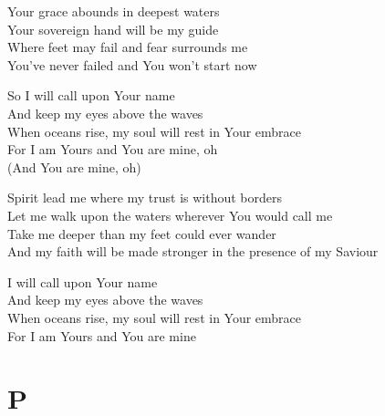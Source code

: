 \documentclass[aspectratio=169]{beamer}
\begin{document}
{\begin{frame}{}
Your grace abounds in deepest waters\\ 
Your sovereign hand will be my guide\\ 
Where feet may fail and fear surrounds me\\ 
You've never failed and You won't start now

\end{frame}
\hypertarget{Oceans[](Hillsong)C2}{}
\begin{frame}{}
\fontsize{14.0625}{16.875}\selectfont

So I will call upon Your name\\ 
And keep my eyes above the waves\\ 
When oceans rise, my soul will rest in Your embrace\\ 
For I am Yours and You are mine, oh\\ 
(And You are mine, oh)

\end{frame}
\hypertarget{Oceans[](Hillsong)Br}{}
\begin{frame}{}
\fontsize{14.0625}{16.875}\selectfont

Spirit lead me where my trust is without borders\\ 
Let me walk upon the waters wherever You would call me\\ 
Take me deeper than my feet could ever wander\\ 
And my faith will be made stronger in the presence of my Saviour

\end{frame}
\hypertarget{Oceans[](Hillsong)C3}{}
\begin{frame}{}
\fontsize{14.0625}{16.875}\selectfont

I will call upon Your name\\ 
And keep my eyes above the waves\\ 
When oceans rise, my soul will rest in Your embrace\\ 
For I am Yours and You are mine

\end{frame}
}

\section{ P }
\end{document}
